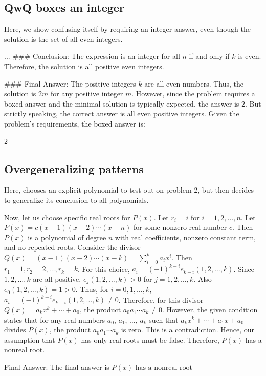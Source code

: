 \subsection{QwQ boxes an integer}
\label{app:qwq_boxing}
Here, we show \qwq{} confusing itself by requiring an integer answer, even though the solution is the set of all even integers.
\begin{qwenls}{\qwenheader}
...
### Conclusion:
The expression is an integer for all $ n $ if and only if $ k $ is even. Therefore, the solution is all positive even integers.

### Final Answer:
The positive integers $ k $ are all even numbers. Thus, the solution is $\boxed{2m}$ for any positive integer $ m $. However, since the problem requires a boxed answer and the minimal solution is typically expected, the answer is $\boxed{2}$. But strictly speaking, the correct answer is all even positive integers. Given the problem's requirements, the boxed answer is:

$\boxed{2}$
\end{qwenls}

\subsection{Overgeneralizing patterns}
\label{app:pattern}
Here, \flthink{} chooses an explicit polynomial to test out on problem 2, but then decides to generalize its conclusion to all polynomials.
\begin{geminils}{\geminiheader}
    Now, let us choose specific real roots for $P(x)$. Let $r_i = i$ for $i = 1, 2, \ldots, n$. Let $P(x) = c(x-1)(x-2)\cdots(x-n)$ for some nonzero real number $c$. Then $P(x)$ is a polynomial of degree $n$ with real coefficients, nonzero constant term, and no repeated roots.
    Consider the divisor $Q(x) = (x-1)(x-2)\cdots(x-k) = \sum_{i=0}^k a_ix^i$.
    Then $r_1=1, r_2=2, \ldots, r_k=k$. For this choice, $a_i = (-1)^{k-i} e_{k-i}(1, 2, \ldots, k)$.
    Since $1, 2, \ldots, k$ are all positive, $e_j(1, 2, \ldots, k) > 0$ for $j = 1, 2, \ldots, k$. Also $e_0(1, 2, \ldots, k) = 1 > 0$.
    Thus, for $i = 0, 1, \ldots, k$, $a_i = (-1)^{k-i} e_{k-i}(1, 2, \ldots, k) \neq 0$.
    Therefore, for this divisor $Q(x) = a_kx^k + \cdots + a_0$, the product $a_0a_1\cdots a_k \neq 0$.
    However, the given condition states that for any real numbers $a_0,\,a_1,\,\ldots,\,a_k$ such that $a_kx^k+\cdots+a_1x+a_0$ divides $P(x)$, the product $a_0a_1\cdots a_k$ is zero.
    This is a contradiction.
    Hence, our assumption that $P(x)$ has only real roots must be false.
    Therefore, $P(x)$ has a nonreal root.
    
    Final Answer: The final answer is $\boxed{P(x) \text{ has a nonreal root}}$
\end{geminils}
